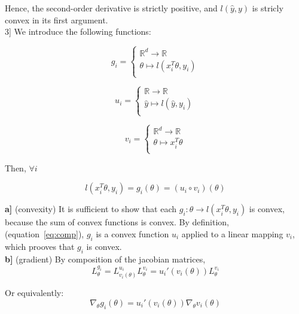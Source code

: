 \documentclass[
10pt, %
a4paper, %
oneside, %
headinclude,footinclude, %
BCOR5mm, %
]{scrartcl}
\begin{document}
Hence, the second-order derivative is strictly positive, and $l( \hat{y}, y)$ is stricly convex in its first argument.
\\

3] We introduce the following functions:

$$
g_i = \left\{
    \begin{array}{ll}
	\mathbb{R}^d\rightarrow \mathbb{R}    \\
	\theta \mapsto   l(x_i^T\theta, y_i) \\
    \end{array}
    \right.
    $$

$$
u_i = \left\{
    \begin{array}{ll}
	\mathbb{R}\rightarrow \mathbb{R}    \\
	\hat{y} \mapsto   l(\hat{y}, y_i) \\
    \end{array}
    \right.
    $$

$$
v_i = \left\{
    \begin{array}{ll}
	\mathbb{R}^d\rightarrow \mathbb{R}    \\
	\theta \mapsto   x_i^T\theta \\
    \end{array}
    \right.
    $$

    Then, $\forall i$

    \begin{equation}
	\label{eq:comp}
	l(x_i^T\theta, y_i) = g_i(\theta)= (u_i\circ v_i)(\theta)
    \end{equation}

\textbf{a]} (convexity) It is sufficient to show that each $g_i:\theta \rightarrow l(x_i^T\theta, y_i) $ is convex, because the sum of convex functions is convex. By definition, (equation~\ref{eq:comp}), $g_i$ is a convex function $u_i$ applied to a linear mapping $v_i$, which prooves that $g_i$ is convex.
\\

\textbf{b]} (gradient) By composition of the jacobian matrices,
    \begin{equation}
    L_{\theta}^{g_i}= L_{v_i(\theta)}^{u_i}L_{\theta}^{v_i}= u_i'(v_i(\theta))L_{\theta}^{v_i}
    \end{equation}

    Or equivalently:
    \begin{equation}
	\nabla_{\theta}g_i(\theta) = u_i'(v_i(\theta))\nabla_{\theta}v_i(\theta)
    \end{equation}
\end{document}
